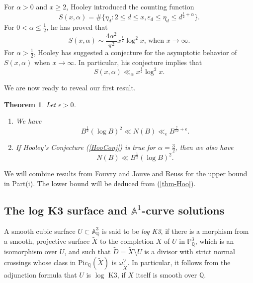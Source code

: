 \documentclass[reqno, 11pt, twoside]{amsart}
\numberwithin{equation}{section}
\newtheorem{theorem}{Theorem}[section]
\theoremstyle{definition}
\renewcommand{\leq}{\leqslant}
\renewcommand{\geq}{\geqslant}
\newcommand{\eps}{\varepsilon}
\newcommand{\PP}{\mathbb{P}}
\newcommand{\AAA}{\mathbb{A}}
\newcommand{\QQ}{\mathbb{Q}}
\begin{document}
For $\alpha > 0$ and $x \geq 2$, Hooley \cite{Hoo} introduced the counting function
\begin{equation*}
    S(x, \alpha) = \# \{ \eta_d: 2 \leq d \leq x,  \eps_d \leq \eta_d \leq d^{\frac{1}{2} + \alpha} \}.
\end{equation*}
For $0 < \alpha \leq \frac{1}{2}$, he \cite[Theorem 1]{Hoo} has proved that
\begin{equation}\label{thm-Hoo}
    S(x, \alpha) \sim \frac{4\alpha^2}{\pi^2} x^{\frac{1}{2}} \log^2 x \text{, when } x \rightarrow \infty.
\end{equation}
For $\alpha > \frac{1}{2}$, Hooley has suggested a conjecture \cite[Conjecture 1]{Hoo} for the asymptotic behavior of $S(x, \alpha)$ when $x \rightarrow \infty$. In particular, his conjecture implies that
\begin{equation}\label{HooConj}
    S(x, \alpha) \ll_\alpha x^{\frac{1}{2}} \log^2 x.
\end{equation}

We are now ready to reveal our first result.
\begin{theorem}\label{thm-cf}
Let $\epsilon > 0$.
    \begin{enumerate}[label=(\roman*)]
        \item We have $$B^\frac{1}{2}(\log B)^2 \ll N(B) \ll_\epsilon B^{\frac{7}{12} + \epsilon}.$$
        \item If Hooley's Conjecture (\ref{HooConj}) is true for $\alpha = \frac{3}{2}$, then we also have $$N(B) \ll B^\frac{1}{2} (\log B)^2.$$
    \end{enumerate}
\end{theorem}
We will combine results from Fouvry and Jouve \cite{FoJo} and Reuss \cite{Reu} for the upper bound in Part(i). The lower bound will be deduced from (\ref{thm-Hoo}).



\subsection{The log K3 surface and $\AAA^1$-curve solutions}
 A smooth cubic surface $U \subset \AAA_\QQ^3$ is said to be \textit{log K3}, if there is a morphism from a smooth, projective surface $\tilde{X}$ to the completion $X$ of $U$ in $\PP_\QQ^3$, which is an isomorphism over $U$, and such that $\tilde{D} = \tilde{X} \setminus U$ is a divisor with strict normal crossings whose class in $\mathrm{Pic}_\QQ (\tilde{X})$ is $\omega_{\tilde{X}}^\lor$. In particular, it follows from the adjunction formula that $U$ is $\log$ K3, if $X$ itself is smooth over $\QQ$.
\end{document}
